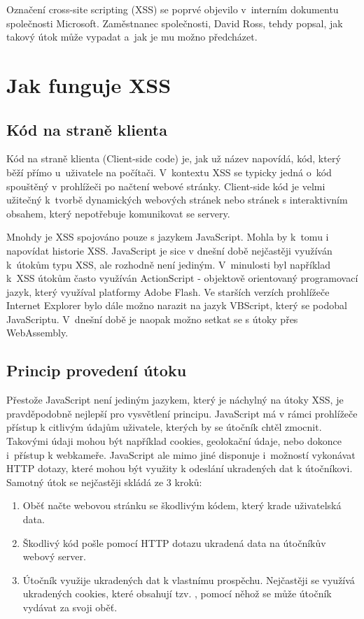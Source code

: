 \documentclass[11pt, conference, a4paper]{IEEEtran}
\begin{document}
Označení cross-site scripting (XSS) se poprvé objevilo  v~interním dokumentu  společnosti Microsoft. Zaměstnanec společnosti, David Ross, tehdy popsal, jak takový útok může vypadat a~jak je mu možno předcházet.~\cite{Grossman2007}


\section{Jak funguje XSS}
\subsection{Kód na straně klienta}
Kód na straně klienta (Client-side code) je, jak už název napovídá, kód, který běží přímo u~uživatele na počítači. V~kontextu XSS se typicky jedná o~kód spouštěný v prohlížeči po načtení webové stránky. Client-side kód je velmi užitečný k~tvorbě dynamických webových stránek nebo stránek s interaktivním obsahem, který nepotřebuje komunikovat se servery.~\cite{XSS-cloudflare}

Mnohdy je XSS spojováno pouze s jazykem JavaScript. Mohla by k~tomu i napovídat historie XSS. JavaScript je sice v dnešní době nejčastěji využíván k~útokům typu XSS, ale rozhodně není jediným. V~minulosti byl například k~XSS útokům často využíván ActionScript - objektově orientovaný programovací jazyk, který využíval platformy Adobe Flash. Ve starších verzích prohlížeče Internet Explorer bylo dále možno narazit na jazyk VBScript, který se podobal JavaScriptu. V~dnešní době je naopak možno setkat se s útoky přes WebAssembly.

\subsection{Princip provedení útoku}
Přestože JavaScript není jediným jazykem, který je náchylný na útoky XSS, je pravděpodobně nejlepší pro vysvětlení principu. JavaScript má v rámci prohlížeče přístup k citlivým údajům uživatele, kterých by se útočník chtěl zmocnit. Takovými údaji mohou být například cookies, geolokační údaje, nebo dokonce i~přístup k webkameře. JavaScript ale mimo jiné disponuje i~možností vykonávat HTTP dotazy, které mohou být využity k odeslání ukradených dat k útočníkovi. Samotný útok se nejčastěji skládá ze 3 kroků:
\begin{enumerate}
    \item Oběť načte webovou stránku se škodlivým kódem, který krade uživatelská data.
    
    \item Škodlivý kód pošle pomocí HTTP dotazu ukradená data na útočníkův webový server.

    \item Útočník využije ukradených dat k vlastnímu prospěchu. Nejčastěji se využívá ukradených cookies, které obsahují tzv. , pomocí něhož se může útočník vydávat za svoji oběť.~\cite{XSS-cloudflare}
    
\end{enumerate}
\end{document}
